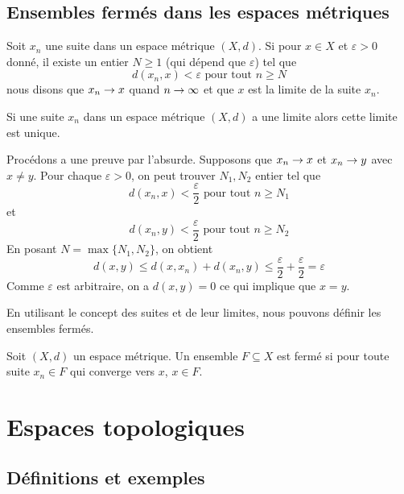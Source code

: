 \documentclass[french]{article}
\begin{document}
\subsection{Ensembles fermés dans les espaces métriques}
\begin{definition}
  Soit $x_n$ une suite dans un espace métrique $(X, d)$. Si pour $x \in X$ et $\varepsilon >0$ donné, il existe un entier $N \geq 1$ (qui dépend que $\varepsilon$) tel que
  $$d(x_n, x) < \varepsilon \text{ pour tout } n \geq N$$
  nous disons que $x_n \rightarrow x$ quand $n \rightarrow \infty$ et que $x$ est la limite de la suite $x_n$.
\end{definition}

\begin{lemme}
  Si une suite $x_n$ dans un espace métrique $(X, d)$ a une limite alors cette limite est unique.

  \tcblower
  \begin{preuve}
    Procédons a une preuve par l'absurde. Supposons que $x_n \rightarrow x$ et $x_n \rightarrow y$ avec $x \neq y$. Pour chaque $\varepsilon > 0$, on peut trouver $N_1, N_2$ entier tel que
    $$d(x_n, x) < \frac{\varepsilon}{2} \text{ pour tout } n \geq N_1$$
    et
    $$d(x_n, y) < \frac{\varepsilon}{2} \text{ pour tout } n \geq N_2$$
    En posant $N = \max\{N_1, N_2\}$, on obtient
    $$d(x, y) \leq d(x, x_n) + d(x_n, y) \leq \frac{\varepsilon}{2} + \frac{\varepsilon}{2} = \varepsilon$$
    Comme $\varepsilon$ est arbitraire, on a $d(x, y) = 0$ ce qui implique que $x = y$.
  \end{preuve}
\end{lemme}
En utilisant le concept des suites et de leur limites, nous pouvons définir les ensembles fermés.

\begin{definition}
  Soit $(X, d)$ un espace métrique. Un ensemble $F \subseteq X$ est fermé si pour toute suite $x_n \in F$ qui converge vers $x$, $x \in F$.
\end{definition}


\section{Espaces topologiques}
\subsection{Définitions et exemples}
\end{document}
